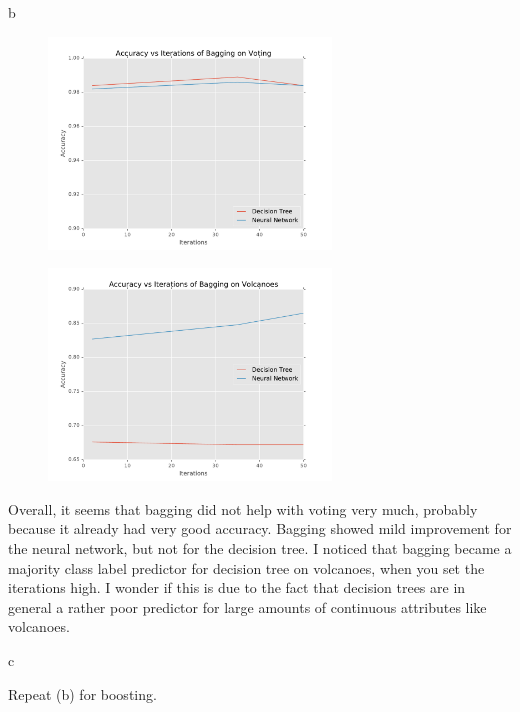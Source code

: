 \documentclass[fleqn]{homework}
\begin{document}
\begin{problem}{b}
    \begin{figure}[h!]
      \centering
      \caption{}
      \label{f:b-voting}
      \includegraphics[width=0.67\textwidth]{b-voting.pdf}
    \end{figure}
    \begin{figure}[h!]
      \centering
      \caption{}
      \label{f:b-volcanoes}
      \includegraphics[width=0.67\textwidth]{b-volcanoes.pdf}
    \end{figure}

    Overall, it seems that bagging did not help with voting very much, probably
    because it already had very good accuracy.  Bagging showed mild improvement
    for the neural network, but not for the decision tree.  I noticed that
    bagging became a majority class label predictor for decision tree on
    volcanoes, when you set the iterations high.  I wonder if this is due to the
    fact that decision trees are in general a rather poor predictor for large
    amounts of continuous attributes like volcanoes.
  \end{problem}

  \begin{problem}{c}
    \begin{question}
      Repeat (b) for boosting.
    \end{question}
  \end{problem}
\end{document}
